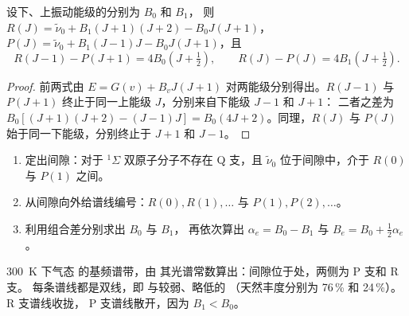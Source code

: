 \begin{theorem}[组合差分]\label{thm:b3:rovibrational-spectroscopy:combination-differences}
设下、上振动能级的分别为 $B_0$ 和 $B_1$，
则 $R(J) = \tilde\nu_0 + B_1(J+1)(J+2) - B_0J(J+1)$，$P(J) = \tilde\nu_0 +
B_1(J-1)J - B_0J(J+1)$，且
\[
R(J - 1) - P(J + 1) = 4B_0(J + \tfrac12), \qquad R(J) - P(J) = 4B_1(J + \tfrac12).
\]
\end{theorem}

\begin{proof}
前两式由 $E = G(v) + B_vJ(J+1)$ 对两能级分别得出。$R(J - 1)$ 与
$P(J + 1)$ 终止于同一上能级 $J$，分别来自下能级 $J - 1$ 和 $J + 1$：
二者之差为 $B_0[(J+1)(J+2) - (J-1)J] = B_0(4J + 2)$。同理，$R(J)$ 与
$P(J)$ 始于同一下能级，分别终止于 $J + 1$ 和 $J - 1$。
\end{proof}

\begin{method}[分析振转谱带]\label{met:b3:rovibrational-spectroscopy:combination}
\begin{enumerate}
  \item 定出间隙：对于 ${}^1\Sigma$ 双原子分子不存在 Q 支，且
        $\tilde\nu_0$ 位于间隙中，介于 $R(0)$ 与 $P(1)$ 之间。
  \item 从间隙向外给谱线编号：$R(0), R(1), \dots$ 与 $P(1),
        P(2), \dots$。
  \item 利用组合差分别求出 $B_0$ 与 $B_1$，
        再依次算出 $\alpha_e = B_0 - B_1$ 与 $B_e = B_0 + \frac12\alpha_e$。
\end{enumerate}
\end{method}

\begin{omfigure}

{\small \qty{300}{K} 下气态  的基频谱带，由
其光谱常数算出：间隙位于处，两侧为 P 支和 R 支。
每条谱线都是双线，即  与较弱、略低的
（天然丰度分别为 76\,\% 和 24\,\%）。R 支谱线收拢，
P 支谱线散开，因为 $B_1 < B_0$。}
\end{omfigure}

